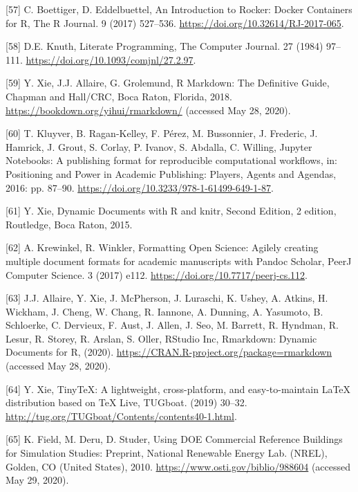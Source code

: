 \documentclass[3p, times]{elsarticle} %
\begin{document}
\leavevmode\hypertarget{ref-Boettiger2017}{}%
{[}57{]} C. Boettiger, D. Eddelbuettel, An Introduction to Rocker: Docker Containers for R, The R Journal. 9 (2017) 527--536. \url{https://doi.org/10.32614/RJ-2017-065}.

\leavevmode\hypertarget{ref-Knuth1984}{}%
{[}58{]} D.E. Knuth, Literate Programming, The Computer Journal. 27 (1984) 97--111. \url{https://doi.org/10.1093/comjnl/27.2.97}.

\leavevmode\hypertarget{ref-Grolemund2018}{}%
{[}59{]} Y. Xie, J.J. Allaire, G. Grolemund, R Markdown: The Definitive Guide, Chapman and Hall/CRC, Boca Raton, Florida, 2018. \url{https://bookdown.org/yihui/rmarkdown/} (accessed May 28, 2020).

\leavevmode\hypertarget{ref-Kluyver2016}{}%
{[}60{]} T. Kluyver, B. Ragan-Kelley, F. Pérez, M. Bussonnier, J. Frederic, J. Hamrick, J. Grout, S. Corlay, P. Ivanov, S. Abdalla, C. Willing, Jupyter Notebooks: A publishing format for reproducible computational workflows, in: Positioning and Power in Academic Publishing: Players, Agents and Agendas, 2016: pp. 87--90. \url{https://doi.org/10.3233/978-1-61499-649-1-87}.

\leavevmode\hypertarget{ref-Xie2015}{}%
{[}61{]} Y. Xie, Dynamic Documents with R and knitr, Second Edition, 2 edition, Routledge, Boca Raton, 2015.

\leavevmode\hypertarget{ref-Krewinkel2017}{}%
{[}62{]} A. Krewinkel, R. Winkler, Formatting Open Science: Agilely creating multiple document formats for academic manuscripts with Pandoc Scholar, PeerJ Computer Science. 3 (2017) e112. \url{https://doi.org/10.7717/peerj-cs.112}.

\leavevmode\hypertarget{ref-Allaire2020}{}%
{[}63{]} J.J. Allaire, Y. Xie, J. McPherson, J. Luraschi, K. Ushey, A. Atkins, H. Wickham, J. Cheng, W. Chang, R. Iannone, A. Dunning, A. Yasumoto, B. Schloerke, C. Dervieux, F. Aust, J. Allen, J. Seo, M. Barrett, R. Hyndman, R. Lesur, R. Storey, R. Arslan, S. Oller, RStudio Inc, Rmarkdown: Dynamic Documents for R, (2020). \url{https://CRAN.R-project.org/package=rmarkdown} (accessed May 28, 2020).

\leavevmode\hypertarget{ref-Xie2019}{}%
{[}64{]} Y. Xie, TinyTeX: A lightweight, cross-platform, and easy-to-maintain LaTeX distribution based on TeX Live, TUGboat. (2019) 30--32. \url{http://tug.org/TUGboat/Contents/contents40-1.html}.

\leavevmode\hypertarget{ref-Field2010}{}%
{[}65{]} K. Field, M. Deru, D. Studer, Using DOE Commercial Reference Buildings for Simulation Studies: Preprint, National Renewable Energy Lab. (NREL), Golden, CO (United States), 2010. \url{https://www.osti.gov/biblio/988604} (accessed May 29, 2020).
\end{document}
